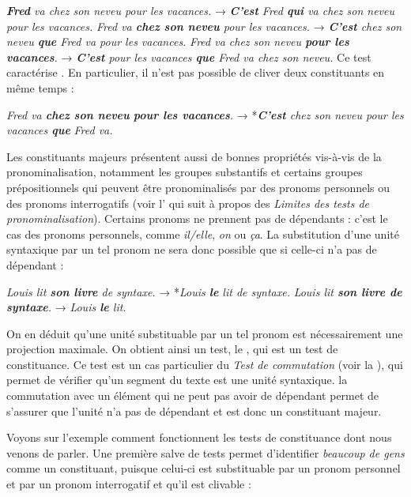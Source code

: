\ea \ea\textit{\textbf{{Fred}}  {va chez son neveu pour les vacances.}}
→ \textit{\textbf{{C’est}}  {Fred} \textbf{{qui}}  {va chez son neveu pour les vacances.}}
\ex
\textit{{Fred va} \textbf{{chez son neveu}}  {pour les vacances.}}
→ \textit{\textbf{{C’est}} chez son neveu \textbf{{que}} Fred va pour les vacances.}
\ex
\textit{{Fred va chez son neveu} \textbf{{pour les vacances}}.}
→ \textit{\textbf{{C’est}}  {pour les vacances} \textbf{{que}}  {Fred va chez son neveu.}}
\z\z
Ce test caractérise . En particulier, il n’est pas possible de cliver deux constituants en même temps :

\ea
\textit{{Fred va} \textbf{{chez son neveu}} \textbf{{pour les vacances}}.}
→  *\textit{\textbf{{C’est}}  {chez son neveu pour les vacances} \textbf{{que}}} \textit{Fred va.}
\z

Les constituants majeurs présentent aussi de bonnes propriétés vis-à-vis de la pronominalisation, notamment les groupes substantifs et certains groupes prépositionnels qui peuvent être pronominalisés par des pronoms personnels ou des pronoms interrogatifs (voir l’ qui suit à propos des \textit{Limites des tests de pronominalisation}). Certains pronoms ne prennent pas de dépendants : c’est le cas des pronoms personnels, comme \textit{il/elle}, \textit{on} ou \textit{ça}. La substitution d’une unité syntaxique par un tel pronom ne sera donc possible que si celle-ci n’a pas de dépendant :

\ea\ea
    \textit{{Louis lit} \textbf{son livre}  {de syntaxe.}}    →  *\textit{Louis \textbf{{le}}  {lit de syntaxe.}}
\ex
    \textit{{Louis lit} \textbf{{son livre de syntaxe}}.}  →   \textit{{Louis} \textbf{{le}}  {lit.}}
\z\z

On en déduit qu’une unité substituable par un tel pronom est nécessairement une projection maximale. On obtient ainsi un test, le , qui est un test de constituance. Ce test est un cas particulier du 
 \textit{Test de commutation} (voir la ), qui permet de vérifier qu'un segment du texte est une unité syntaxique. la commutation avec un élément qui ne peut pas avoir de dépendant permet de s'assurer que l'unité n'a pas de dépendant et est donc un constituant majeur.

Voyons sur l'exemple  comment fonctionnent les tests de constituance dont nous venons de parler. Une première salve de tests permet d’identifier \textit{beaucoup de gens} comme un constituant, puisque celui-ci est substituable par un pronom personnel et par un pronom interrogatif et qu’il est clivable :

